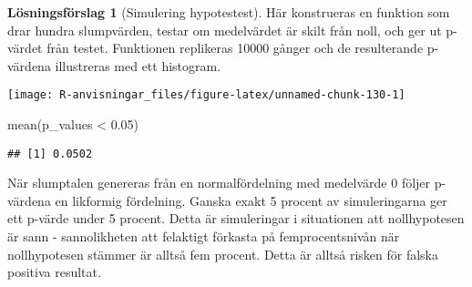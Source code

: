 \documentclass[
]{book}
\newenvironment{Shaded}{\begin{snugshade}}{\end{snugshade}}
\newcommand{\AttributeTok}[1]{\textcolor[rgb]{0.77,0.63,0.00}{#1}}
\newcommand{\ControlFlowTok}[1]{\textcolor[rgb]{0.13,0.29,0.53}{\textbf{#1}}}
\newcommand{\DecValTok}[1]{\textcolor[rgb]{0.00,0.00,0.81}{#1}}
\newcommand{\FloatTok}[1]{\textcolor[rgb]{0.00,0.00,0.81}{#1}}
\newcommand{\FunctionTok}[1]{\textcolor[rgb]{0.00,0.00,0.00}{#1}}
\newcommand{\NormalTok}[1]{#1}
\newcommand{\OtherTok}[1]{\textcolor[rgb]{0.56,0.35,0.01}{#1}}
\newcommand{\SpecialCharTok}[1]{\textcolor[rgb]{0.00,0.00,0.00}{#1}}
\theoremstyle{definition}
\theoremstyle{definition}
\theoremstyle{definition}
\theoremstyle{definition}
\newtheorem{hypothesis}{Lösningsförslag}[chapter]
\theoremstyle{remark}
\begin{document}
\begin{hypothesis}[Simulering hypotestest]
Här konstrueras en funktion som drar hundra slumpvärden, testar om medelvärdet är skilt från noll, och ger ut p-värdet från testet. Funktionen replikeras 10000 gånger och de resulterande p-värdena illustreras med ett histogram.

\begin{Shaded}
\end{Shaded}

\begin{center}\texttt{[image: R-anvisningar\_files/figure-latex/unnamed-chunk-130-1]} \end{center}

\begin{Shaded}
\begin{Highlighting}[]
\FunctionTok{mean}\NormalTok{(p\_values }\SpecialCharTok{\textless{}} \FloatTok{0.05}\NormalTok{)}
\end{Highlighting}
\end{Shaded}

\begin{verbatim}
## [1] 0.0502
\end{verbatim}

När slumptalen genereras från en normalfördelning med medelvärde 0 följer p-värdena en likformig fördelning. Ganska exakt 5 procent av simuleringarna ger ett p-värde under 5 procent. Detta är simuleringar i situationen att nollhypotesen är sann - sannolikheten att felaktigt förkasta på femprocentsnivån när nollhypotesen stämmer är alltså fem procent. Detta är alltså risken för falska positiva resultat.


\end{hypothesis}
\end{document}

